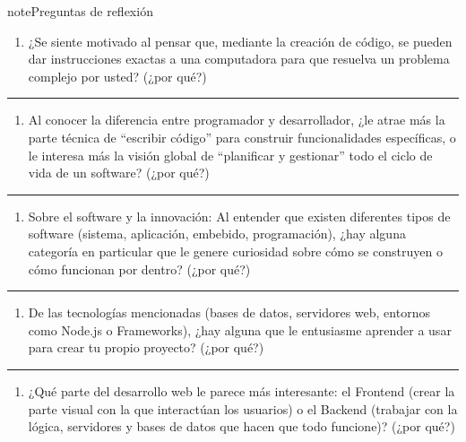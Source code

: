\documentclass[letterpaper,10pt,spanish]{sphinxmanual}
\begin{document}
\begin{sphinxadmonition}{note}{Preguntas de reflexión}
\begin{enumerate}
%
\item {} 
\sphinxAtStartPar
¿Se siente motivado al pensar que, mediante la creación de código, se pueden dar instrucciones exactas a una computadora para que resuelva un problema complejo por usted? (¿por qué?)

\end{enumerate}


\bigskip\hrule\bigskip

\begin{enumerate}
%
\setcounter{enumi}{1}
\item {} 
\sphinxAtStartPar
Al conocer la diferencia entre programador y desarrollador, ¿le atrae más la parte técnica de “escribir código” para construir funcionalidades específicas, o le interesa más la visión global de “planificar y gestionar” todo el ciclo de vida de un software? (¿por qué?)

\end{enumerate}


\bigskip\hrule\bigskip

\begin{enumerate}
%
\setcounter{enumi}{2}
\item {} 
\sphinxAtStartPar
Sobre el software y la innovación: Al entender que existen diferentes tipos de software (sistema, aplicación, embebido, programación), ¿hay alguna categoría en particular que le genere curiosidad sobre cómo se construyen o cómo funcionan por dentro? (¿por qué?)

\end{enumerate}


\bigskip\hrule\bigskip

\begin{enumerate}
%
\setcounter{enumi}{3}
\item {} 
\sphinxAtStartPar
De las tecnologías mencionadas (bases de datos, servidores web, entornos como Node.js o Frameworks), ¿hay alguna que le entusiasme aprender a usar para crear tu propio proyecto? (¿por qué?)

\end{enumerate}


\bigskip\hrule\bigskip

\begin{enumerate}
%
\setcounter{enumi}{4}
\item {} 
\sphinxAtStartPar
¿Qué parte del desarrollo web le parece más interesante: el Front\sphinxhyphen{}end (crear la parte visual con la que interactúan los usuarios) o el Back\sphinxhyphen{}end (trabajar con la lógica, servidores y bases de datos que hacen que todo funcione)? (¿por qué?)


\end{enumerate}
\end{sphinxadmonition}
\end{document}
